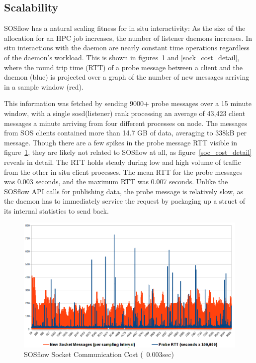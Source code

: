 
\subsection{Scalability}

SOSflow has a natural scaling fitness for in situ interactivity: As
the size of the allocation for an HPC job increases, the number of
listener daemons increases.
%
In situ interactions with the daemon are nearly constant time
operations regardless of the daemon's workload.
%
This is shown in figures~\ref{sock_cost} and \ref{sock_cost_detail},
where the round trip time (RTT) of a probe message between a client
and the daemon (blue) is projected over a graph of the number of new
messages arriving in a sample window (red).

This information was fetched by sending 9000+ probe messages over a 15
minute window, with a single sosd(listener) rank processing an average
of 43,423 client messages a minute arriving from four different
processes on node.
%
The messages from SOS clients contained more than 14.7 GB of data,
averaging to 338kB per message.
%
Though there are a few spikes in the probe message RTT visible in
figure~\ref{sock_cost}, they are likely not related to SOSflow at all,
as figure~\ref{soc_cost_detail} reveals in detail.
%
The RTT holds steady during low and high volume of traffic from the
other in situ client processes.
%
The mean RTT for the probe messages was 0.003 seconds, and the maximum
RTT was 0.007 seconds.
%
Unlike the SOSflow API calls for publishing data, the probe message is
relatively slow, as the daemon has to immediately service the request
by packaging up a struct of its internal statistics to send back.

\begin{figure}[!t]
\centering
\includegraphics[width=5in]{images/icebox_api_cost_when_slam.png}
\caption{SOSflow Socket Communication Cost (~0.003sec)}
\label{sock_cost}
\end{figure}

